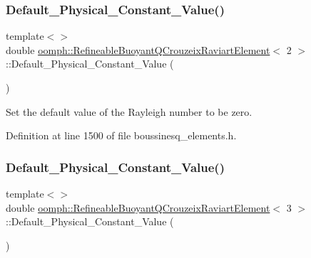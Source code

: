 \subsubsection{\texorpdfstring{Default\+\_\+\+Physical\+\_\+\+Constant\+\_\+\+Value()}{Default\_Physical\_Constant\_Value()}\hspace{0.1cm}{\footnotesize\ttfamily [1/2]}}
{\footnotesize\ttfamily template$<$$>$ \\
double \hyperlink{classoomph_1_1RefineableBuoyantQCrouzeixRaviartElement}{oomph\+::\+Refineable\+Buoyant\+Q\+Crouzeix\+Raviart\+Element}$<$ 2 $>$\+::Default\+\_\+\+Physical\+\_\+\+Constant\+\_\+\+Value (\begin{DoxyParamCaption}{ }\end{DoxyParamCaption})\hspace{0.3cm}{\ttfamily [private]}}



Set the default value of the Rayleigh number to be zero. 



Definition at line 1500 of file boussinesq\+\_\+elements.\+h.

\mbox{\label{classoomph_1_1RefineableBuoyantQCrouzeixRaviartElement_a4e22ae2489586ac69c1e5ebcb04e6343}} 
\subsubsection{\texorpdfstring{Default\+\_\+\+Physical\+\_\+\+Constant\+\_\+\+Value()}{Default\_Physical\_Constant\_Value()}\hspace{0.1cm}{\footnotesize\ttfamily [2/2]}}
{\footnotesize\ttfamily template$<$$>$ \\
double \hyperlink{classoomph_1_1RefineableBuoyantQCrouzeixRaviartElement}{oomph\+::\+Refineable\+Buoyant\+Q\+Crouzeix\+Raviart\+Element}$<$ 3 $>$\+::Default\+\_\+\+Physical\+\_\+\+Constant\+\_\+\+Value (\begin{DoxyParamCaption}{ }\end{DoxyParamCaption})\hspace{0.3cm}{\ttfamily [private]}}



